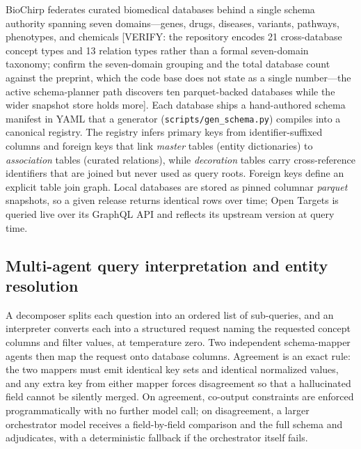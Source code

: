 BioChirp federates curated biomedical databases behind a single schema authority spanning seven domains---genes, drugs, diseases, variants, pathways, phenotypes, and chemicals [VERIFY: the repository encodes 21 cross-database concept types and 13 relation types rather than a formal seven-domain taxonomy; confirm the seven-domain grouping and the total database count against the preprint, which the code base does not state as a single number---the active schema-planner path discovers ten parquet-backed databases while the wider snapshot store holds more]. Each database ships a hand-authored schema manifest in YAML that a generator (\texttt{scripts/gen\_schema.py}) compiles into a canonical registry. The registry infers primary keys from identifier-suffixed columns and foreign keys that link \textit{master} tables (entity dictionaries) to \textit{association} tables (curated relations), while \textit{decoration} tables carry cross-reference identifiers that are joined but never used as query roots. Foreign keys define an explicit table join graph. Local databases are stored as pinned columnar \textit{parquet} snapshots, so a given release returns identical rows over time; Open Targets is queried live over its GraphQL API and reflects its upstream version at query time.

\subsection*{Multi-agent query interpretation and entity resolution}

A decomposer splits each question into an ordered list of sub-queries, and an interpreter converts each into a structured request naming the requested concept columns and filter values, at temperature zero. Two independent schema-mapper agents then map the request onto database columns. Agreement is an exact rule: the two mappers must emit identical key sets and identical normalized values, and any extra key from either mapper forces disagreement so that a hallucinated field cannot be silently merged. On agreement, co-output constraints are enforced programmatically with no further model call; on disagreement, a larger orchestrator model receives a field-by-field comparison and the full schema and adjudicates, with a deterministic fallback if the orchestrator itself fails.

